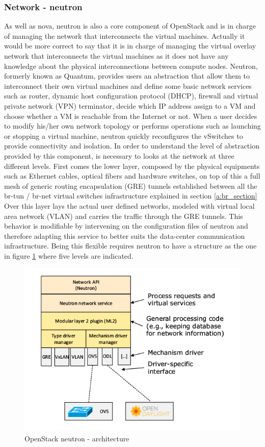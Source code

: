 \subsubsection{Network - neutron}
As well as nova, neutron is also a core component of OpenStack and is in charge of managing the network that interconnects the virtual machines.
Actually it would be more correct to say that it is in charge of managing the virtual overlay network that interconnects the virtual machines as it does not have any knowledge about the physical interconnections between compute nodes.
Neutron, formerly known as Quantum, provides users an abstraction that allow them to interconnect their own virtual machines and define some basic network services such as router, dynamic host configuration protocol (DHCP), firewall and virtual private network (VPN) terminator, decide which IP address assign to a VM and choose whether a VM is reachable from the Internet or not.
When a user decides to modify his/her own network topology or performs operations such as launching or stopping a virtual machine, neutron quickly reconfigures the vSwitches to provide connectivity and isolation.
In order to understand the level of abstraction provided by this component, is necessary to looks at the network at three different levels.
First comes the lower layer, composed by the physical equipments such as Ethernet cables, optical fibers and hardware switches, on top of this a full mesh of generic routing encapsulation (GRE) tunnels established between all the br-tun / br-net virtual switches infrastructure explained in section \ref{a:br_section}
Over this layer lays the actual user defined networks, modeled with virtual local area network (VLAN) and carries the traffic through the GRE tunnels.
This behavior is modifiable by intervening on the configuration files of neutron and therefore adapting this service to better suits the data-center communication infrastructure.
Being this flexible requires neutron to have a structure as the one in figure \ref{fig:neutron_structure} where five levels are indicated.
\begin{figure}[h]
	\centering
	\includegraphics[clip= true, width= \columnwidth]{images/neutron_structure.png}
	\caption{OpenStack neutron - architecture}
	\label{fig:neutron_structure}
\end{figure}
